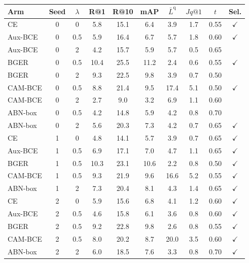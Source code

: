 \begingroup
\captionsetup{type=table}
\centering\footnotesize\setlength{\tabcolsep}{2.5pt}
\caption{Complete OSLD development record (official validation: 1,295 queries, 7,272 train+validation templates; \%). Seed-0 rows select $\lambda$ within each arm (Recall@1 within 1~pp of the arm's best, then highest $\bar L^{\mathrm q}$, ties to the smaller $\lambda$); seeds 1--2 lock thresholds.}
\label{tab:osld-dev}
\begin{tabular}{lccccccccc}
\toprule
Arm & Seed & $\lambda$ & R@1 & R@10 & mAP & $\bar L^{\mathrm q}$ & $Jq@1$ & $t$ & Sel.\\
\midrule
CE & 0 & 0 & 5.8 & 15.1 & 6.4 & 3.9 & 1.7 & 0.55 & $\checkmark$\\
Aux-BCE & 0 & 0.5 & 5.9 & 16.4 & 6.7 & 5.7 & 1.8 & 0.60 & $\checkmark$\\
Aux-BCE & 0 & 2 & 4.2 & 15.7 & 5.9 & 5.7 & 0.5 & 0.65 & \\
BGER & 0 & 0.5 & 10.4 & 25.5 & 11.2 & 2.4 & 0.6 & 0.55 & $\checkmark$\\
BGER & 0 & 2 & 9.3 & 22.5 & 9.8 & 3.9 & 0.7 & 0.50 & \\
CAM-BCE & 0 & 0.5 & 8.8 & 21.4 & 9.5 & 17.4 & 5.1 & 0.50 & $\checkmark$\\
CAM-BCE & 0 & 2 & 2.7 & 9.0 & 3.2 & 6.9 & 1.1 & 0.60 & \\
ABN-box & 0 & 0.5 & 4.2 & 14.8 & 5.9 & 4.2 & 0.8 & 0.70 & \\
ABN-box & 0 & 2 & 5.6 & 20.3 & 7.3 & 4.2 & 0.7 & 0.65 & $\checkmark$\\
CE & 1 & 0 & 4.8 & 14.1 & 5.7 & 3.9 & 0.7 & 0.65 & $\checkmark$\\
Aux-BCE & 1 & 0.5 & 6.9 & 17.1 & 7.0 & 4.7 & 1.1 & 0.65 & $\checkmark$\\
BGER & 1 & 0.5 & 10.3 & 23.1 & 10.6 & 2.2 & 0.8 & 0.50 & $\checkmark$\\
CAM-BCE & 1 & 0.5 & 9.3 & 21.9 & 9.6 & 16.6 & 5.2 & 0.55 & $\checkmark$\\
ABN-box & 1 & 2 & 7.3 & 20.4 & 8.1 & 4.3 & 1.4 & 0.65 & $\checkmark$\\
CE & 2 & 0 & 5.9 & 15.6 & 6.8 & 4.1 & 1.2 & 0.60 & $\checkmark$\\
Aux-BCE & 2 & 0.5 & 4.6 & 15.8 & 6.1 & 3.6 & 0.8 & 0.60 & $\checkmark$\\
BGER & 2 & 0.5 & 9.2 & 22.8 & 9.8 & 2.6 & 0.8 & 0.55 & $\checkmark$\\
CAM-BCE & 2 & 0.5 & 8.0 & 20.2 & 8.7 & 20.0 & 3.5 & 0.60 & $\checkmark$\\
ABN-box & 2 & 2 & 6.0 & 18.5 & 7.6 & 3.3 & 0.8 & 0.70 & $\checkmark$\\
\bottomrule
\end{tabular}
\par
\endgroup

